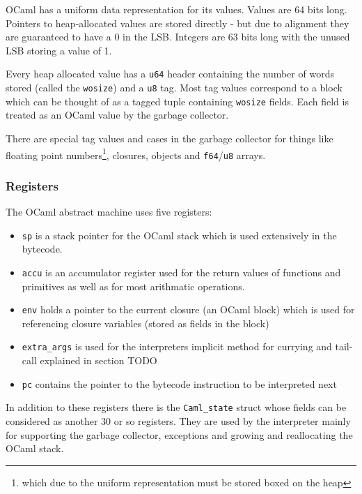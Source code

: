 OCaml has a uniform data representation for its values. Values are 64 bits long. Pointers to
heap-allocated values are
stored directly - but due to alignment they are guaranteed to have a 0 in the LSB. Integers are 63
bits long
with the unused LSB storing a value of 1.

Every heap allocated value has a \texttt{u64} header containing the number of words stored (called
the \texttt{wosize}) and a \texttt{u8} tag. Most tag values correspond to a block which can be
thought of as a tagged tuple containing \texttt{wosize} fields. Each field is treated as an OCaml
value by the garbage collector.

There are special tag values and cases in the garbage collector for things like floating point
numbers\footnote{which due to the uniform representation must be stored boxed on the heap},
closures, objects and \texttt{f64}/\texttt{u8} arrays.

\subsubsection{Registers}

The OCaml abstract machine uses five registers:

\begin{itemize}
    \item \texttt{sp} is a stack pointer for the OCaml stack which is used extensively
          in the bytecode.
    \item \texttt{accu} is an accumulator register used for the return values of functions
          and primitives as well as for most arithmatic operations.
    \item \texttt{env} holds a pointer to the current closure (an OCaml block) which is used for
          referencing
          closure variables (stored as fields in the block)
    \item \texttt{extra\_args} is used for the interpreters implicit method for currying and
          tail-call explained in section TODO
    \item \texttt{pc} contains the pointer to the bytecode instruction to be interpreted next
\end{itemize}

In addition to these registers there is the \texttt{Caml\_state} struct whose fields can be
considered as another 30 or so registers. They are used by the interpreter mainly for supporting
the garbage collector, exceptions and growing and reallocating the OCaml stack.


